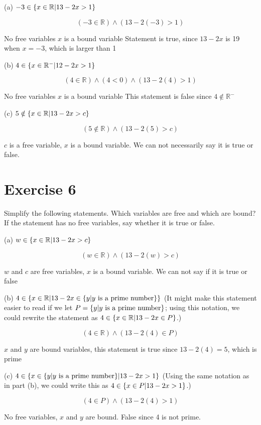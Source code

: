 \documentclass[11pt]{article}
\begin{document}
\noindent (a) $-3 \in \{x \in \mathbb{R} \text{\textbar} 13 - 2x > 1\}$

$$(-3 \in \mathbb{R}) \wedge (13 - 2(-3) > 1)$$

No free variables
$x$ is a bound variable
Statement is true, since $13 - 2x$ is 19 when $x=-3$, which is larger than 1

\noindent (b) $4 \in \{x \in \mathbb{R}^- \text{\textbar} 12 - 2x > 1 \}$

$$(4 \in \mathbb{R}) \wedge (4 < 0) \wedge (13 - 2(4) > 1)$$

No free variables
$x$ is a bound variable
This statement is false since $4 \notin \mathbb{R}^-$

\noindent (c) $5 \notin \{x \in \mathbb{R} \text{\textbar} 13 - 2x > c\}$

$$(5 \notin \mathbb{R}) \wedge (13 - 2(5) > c)$$

$c$ is a free variable, $x$ is a bound variable. We can not necessarily say it is true or false.

\section*{Exercise 6}

Simplify the following statements. Which variables are free and which are bound? If the statement has no free variables, say whether it is true or false.

\noindent (a) $w \in \{x \in \mathbb{R} \text{\textbar} 13-2x > c\}$

$$(w \in \mathbb{R}) \wedge (13-2(w) > c)$$

$w$ and $c$ are free variables, $x$ is a bound variable. We can not say if it is true or false

\noindent (b) $4 \in \{x \in \mathbb{R} \text{\textbar} 13 - 2x \in \{y \text{\textbar} y \text{ is a prime number}\}\}$
(It might make this statement easier to read if we let $P = \{y \text{\textbar} y \text{ is a prime number}\}$;
using this notation, we could rewrite the statement as 
$4 \in \{x \in \mathbb{R} \text{\textbar} 13 - 2x \in P\}$.)

$$(4 \in \mathbb{R}) \wedge (13 - 2(4) \in P)$$

$x$ and $y$ are bound variables, this statement is true since $13 - 2(4) = 5$, which is prime

\noindent (c) $4 \in \{x \in \{y \text{\textbar} y \text{ is a prime number}\} \text{\textbar} 13 - 2x > 1\}$
(Using the same notation as in part (b), we could write this as $4 \in \{x \in P \text{\textbar} 13 - 2x > 1\}$.)

$$(4 \in P) \wedge (13 - 2(4) > 1)$$

No free variables, $x$ and $y$ are bound. False since 4 is not prime.
\end{document}
